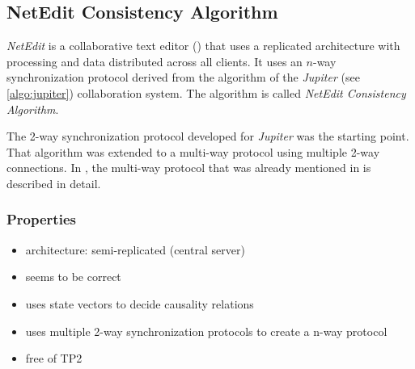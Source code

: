 \subsection{NetEdit Consistency Algorithm}
\label{algo:netedit}

\emph{NetEdit} is a collaborative text editor (\cite{netedit}) that uses a replicated architecture with processing and data distributed across all clients. It uses an $n$-way synchronization protocol derived from the algorithm of the \emph{Jupiter} (see \ref{algo:jupiter}) collaboration system. The algorithm is called \emph{NetEdit Consistency Algorithm}.

The 2-way synchronization protocol developed for \emph{Jupiter} was the starting point. That algorithm was extended to a multi-way protocol using multiple 2-way connections. In \cite{netedit:thesis}, the multi-way protocol that was already mentioned in \cite{jupiter95} is described in detail.

\subsubsection{Properties}
\begin{itemize}
 \item architecture: semi-replicated (central server)
 \item seems to be correct
 \item uses state vectors to decide causality relations
 \item uses multiple 2-way synchronization protocols to create a n-way protocol
 \item free of TP2
\end{itemize}

